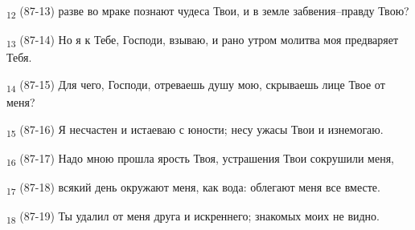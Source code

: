 \begin{tcolorbox}
\textsubscript{12} (87-13) разве во мраке познают чудеса Твои, и в земле забвения--правду Твою?
\end{tcolorbox}
\begin{tcolorbox}
\textsubscript{13} (87-14) Но я к Тебе, Господи, взываю, и рано утром молитва моя предваряет Тебя.
\end{tcolorbox}
\begin{tcolorbox}
\textsubscript{14} (87-15) Для чего, Господи, отреваешь душу мою, скрываешь лице Твое от меня?
\end{tcolorbox}
\begin{tcolorbox}
\textsubscript{15} (87-16) Я несчастен и истаеваю с юности; несу ужасы Твои и изнемогаю.
\end{tcolorbox}
\begin{tcolorbox}
\textsubscript{16} (87-17) Надо мною прошла ярость Твоя, устрашения Твои сокрушили меня,
\end{tcolorbox}
\begin{tcolorbox}
\textsubscript{17} (87-18) всякий день окружают меня, как вода: облегают меня все вместе.
\end{tcolorbox}
\begin{tcolorbox}
\textsubscript{18} (87-19) Ты удалил от меня друга и искреннего; знакомых моих не видно.
\end{tcolorbox}
